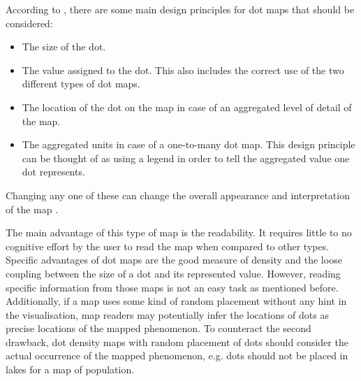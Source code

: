 According to \citeauthor{Tyner2010}, there are some main design principles for dot maps that should be considered:
\begin{itemize}
\item The size of the dot.
\item The value assigned to the dot. This also includes the correct use of the two different types of dot maps.
\item The location of the dot on the map in case of an aggregated level of detail of the map.
\item The aggregated units in case of a one-to-many dot map. This design principle can be thought of as using a legend in order to tell the aggregated value one dot represents.
\end{itemize}
Changing any one of these can change the overall appearance and interpretation of the map .

The main advantage of this type of map is the readability. It requires little to no cognitive effort by the user to read the map when compared to other types. Specific advantages of dot maps are the good measure of density and the loose coupling between the size of a dot and its represented value.
However, reading specific information from those maps is not an easy task as mentioned before. Additionally, if a map uses some kind of random placement without any hint in the visualisation, map readers may potentially infer the locations of dots as precise locations of the mapped phenomenon. To counteract the second drawback, dot density maps with random placement of dots should consider the actual occurrence of the mapped phenomenon, e.g. dots should not be placed in lakes for a map of population.

